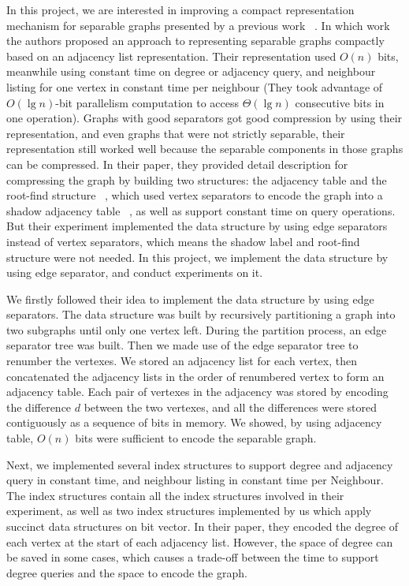 \documentclass[12pt,glossary]{dalthesis}
\begin{document}
\bigskip

In this project, we are interested in improving a compact representation mechanism for separable graphs presented by a previous work ~\cite{compact-representation}. In which work the authors proposed an approach to representing separable graphs compactly based on an adjacency list representation. Their representation used $O(n)$ bits, meanwhile using constant time on degree or adjacency query, and neighbour listing for one vertex in constant time per neighbour (They took advantage of $O(\lg n)$-bit parallelism computation to access $\Theta(\lg n)$ consecutive bits in one operation). Graphs with good separators got good compression by using their representation, and even graphs that were not strictly separable, their representation still worked well because the separable components in those graphs can be compressed. In their paper, they provided detail description for compressing the graph by building two structures: the adjacency table and the root-find structure ~\cite{compact-representation}, which used vertex separators to encode the graph into a shadow adjacency table ~\cite{compact-representation}, as well as support constant time on query operations. But their experiment implemented the data structure by using edge separators instead of vertex separators, which means the shadow label and root-find structure were not needed. In this project, we implement the data structure by using edge separator, and conduct experiments on it.

\bigskip
\bigskip

We firstly followed their idea to implement the data structure by using edge separators. The data structure was built by recursively partitioning a graph into two subgraphs until only one vertex left. During the partition process, an edge separator tree was built. Then we made use of the edge separator tree to renumber the vertexes. We stored an adjacency list for each vertex, then concatenated the adjacency lists in the order of renumbered vertex to form an adjacency table. Each pair of vertexes in the adjacency was stored by encoding the difference $d$ between the two vertexes, and all the differences were stored contiguously as a sequence of bits in memory. We showed, by using adjacency table, $O(n)$ bits were sufficient to encode the separable graph. 

\bigskip
\bigskip

Next, we implemented several index structures to support degree and adjacency query in constant time, and neighbour listing in constant time per Neighbour. The index structures contain all the index structures involved in their experiment, as well as two index structures implemented by us which apply succinct data structures on bit vector. In their paper, they encoded the degree of each vertex at the start of each adjacency list. However, the space of degree can be saved in some cases, which causes a trade-off between the time to support degree queries and the space to encode the graph.
\end{document}
